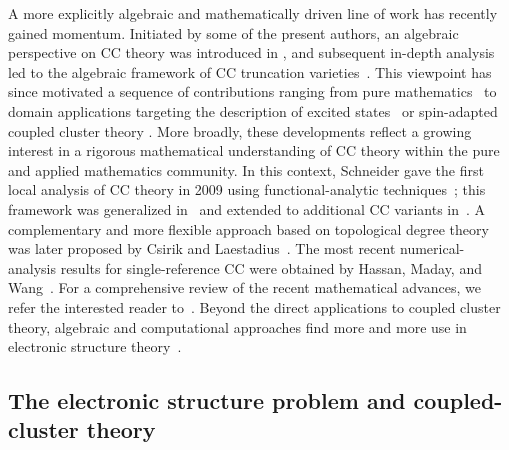 \documentclass[11pt,reqno]{amsart}
\theoremstyle{definition}
\numberwithin{theorem}{section}
\numberwithin{equation}{section}
\begin{document}
A more explicitly algebraic and mathematically driven line of work has recently gained momentum. Initiated by some of the present authors, an algebraic perspective on CC theory was introduced in \cite{faulstich2024coupled}, and subsequent in-depth analysis led to the algebraic framework of CC truncation varieties~\cite{faulstich2024algebraic}. This viewpoint has since motivated a sequence of contributions ranging from pure mathematics~\cite{borovik2024coupled,sverrisdottir2025algebraic,price2026plane} to domain applications targeting the description of excited states~\cite{faulstich2026algebraic} or spin-adapted coupled cluster theory \cite{sverrisdottir2024exploring}.
More broadly, these developments reflect a growing interest in a rigorous mathematical understanding of CC theory within the pure and applied mathematics community. In this context, Schneider gave the first local analysis of CC theory in 2009 using functional-analytic techniques~\cite{schneider2009analysis}; this framework was generalized in~\cite{rohwedder2013continuous,rohwedder2013error} and extended to additional CC variants in~\cite{laestadius2018analysis,laestadius2019coupled,faulstich2019analysis}. A complementary and more flexible approach based on topological degree theory was later proposed by Csirik and Laestadius~\cite{csirik2023disc,csirik2023coupled}. The most recent numerical-analysis results for single-reference CC were obtained by Hassan, Maday, and Wang~\cite{hassan2023analysis,hassan2023analysis2}. For a comprehensive review of the recent mathematical advances, we refer the interested reader to~\cite{faulstich2024recent}. Beyond the direct applications to coupled cluster theory, algebraic and computational approaches find more and more use in electronic structure theory~\cite{gontier2019numerical,cances2024mathematical,pokhilko2025homotopy,harwood2022improving,borovik2025numerical}.


\subsection{The electronic structure problem and coupled-cluster theory}
\label{sec:background}
\end{document}
